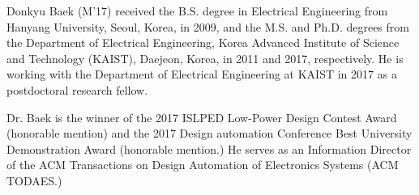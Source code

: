 \documentclass{IEEEtran}
\begin{document}
\begin{IEEEbiography}{Donkyu Baek}
(M'17) received the B.S. degree in Electrical Engineering from Hanyang University, Seoul, Korea, in 2009, and the M.S. and Ph.D. degrees from the Department of Electrical Engineering, Korea Advanced Institute of Science and Technology (KAIST), Daejeon, Korea, in 2011 and 2017, respectively. He is working with the Department of Electrical Engineering at KAIST in 2017 as a postdoctoral research fellow. 

Dr. Baek is the winner of the 2017 ISLPED Low-Power Design Contest Award (honorable mention) and the 2017 Design automation Conference Best University Demonstration Award (honorable mention.) He serves as an Information Director of the ACM Transactions on Design Automation of Electronics Systems (ACM TODAES.)
\end{IEEEbiography}

\end{document}
